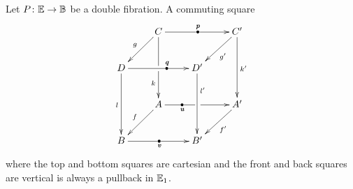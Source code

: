 \documentclass[9pt, leqno]{amsart}
\begin{document}
%	
	

\begin{lemma}\label{vpullbacks}
	Let $P \colon \mathbb{E} \to \mathbb{B}$ be a double fibration. A commuting square 
	\begin{equation*}
		\xymatrix{
			&C \ar[rr]|{\bullet}^{\mathbi{p}} \ar[dd]_(.7){k}|\hole \ar[dl]_{g} && C^\prime \ar[dd]^{k^\prime} \ar[dl]^{g^\prime} \\
			D \ar[rr]|(.6){\bullet}^(.6){\mathbi{q}} \ar[dd]_{l} && D^\prime \ar[dd]^(.3){l^\prime} \\
			& A \ar[rr]|(.3){\bullet}_(.3){\mathbi{u}}|\hole \ar[dl]_{f}  && A^\prime \ar[dl]^{f^\prime}  \\
			B \ar[rr]|{\bullet}_{\mathbi{v}} && B^\prime
		}
	\end{equation*}
	where the top and bottom squares are cartesian and the front and back squares are vertical is always a pullback in $\mathbb{E}_1$.
\end{lemma}
\end{document}

